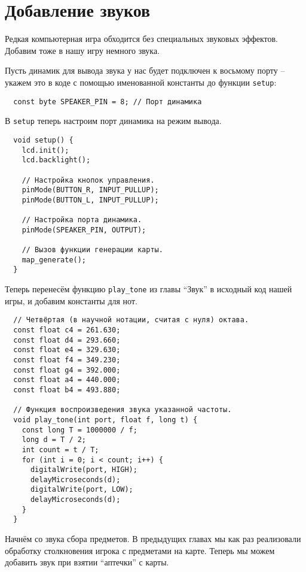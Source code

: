 \documentclass[../sparc.tex]{subfiles}
\begin{document}
\section{Добавление звуков}

Редкая компьютерная игра обходится без специальных звуковых эффектов.  Добавим
тоже в нашу игру немного звука.

Пусть динамик для вывода звука у нас будет подключен к восьмому порту -- укажем
это в коде с помощью именованной константы до функции \texttt{setup}:

\begin{verbatim}
  const byte SPEAKER_PIN = 8; // Порт динамика
\end{verbatim}

В \texttt{setup} теперь настроим порт динамика на режим вывода.

\begin{verbatim}
  void setup() {
    lcd.init();
    lcd.backlight();

    // Настройка кнопок управления.
    pinMode(BUTTON_R, INPUT_PULLUP);
    pinMode(BUTTON_L, INPUT_PULLUP);

    // Настройка порта динамика.
    pinMode(SPEAKER_PIN, OUTPUT);

    // Вызов функции генерации карты.
    map_generate();
  }
\end{verbatim}

Теперь перенесём функцию \texttt{play\_tone} из главы ``Звук'' в исходный код
нашей игры, и добавим константы для нот.

\begin{verbatim}
  // Четвёртая (в научной нотации, считая с нуля) октава.
  const float c4 = 261.630;
  const float d4 = 293.660;
  const float e4 = 329.630;
  const float f4 = 349.230;
  const float g4 = 392.000;
  const float a4 = 440.000;
  const float b4 = 493.880;

  // Функция воспроизведения звука указанной частоты.
  void play_tone(int port, float f, long t) {
    const long T = 1000000 / f;
    long d = T / 2;
    int count = t / T;
    for (int i = 0; i < count; i++) {
      digitalWrite(port, HIGH);
      delayMicroseconds(d);
      digitalWrite(port, LOW);
      delayMicroseconds(d);
    }
  }
\end{verbatim}

Начнём со звука сбора предметов.  В предыдущих главах мы как раз реализовали
обработку столкновения игрока с предметами на карте.  Теперь мы можем добавить
звук при взятии ``аптечки'' с карты.
\end{document}
